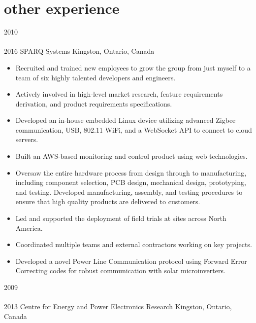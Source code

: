 
\section{other experience}
\begin{entrylist}
\entry
  {2010\\\faChevronDown\\2016}
  {SPARQ Systems}
  {Kingston, Ontario, Canada}
  {
  \begin{itemize}[leftmargin=12pt]
    \item Recruited and trained new employees to grow the group from just myself to a team of six highly talented developers and engineers.
    \item Actively involved in high-level market research, feature requirements derivation, and product requirements specifications.
    \item Developed an in-house embedded Linux device utilizing advanced Zigbee communication, USB, 802.11 WiFi, and a WebSocket API to connect to cloud servers.
    \item Built an AWS-based monitoring and control product using web technologies.
    \item Oversaw the entire hardware process from design through to manufacturing, including component selection, PCB design, mechanical design, prototyping, and testing. Developed manufacturing, assembly, and testing procedures to ensure that high quality products are delivered to customers.
    \item Led and supported the deployment of field trials at sites across North America.
    \item Coordinated multiple teams and external contractors working on key projects.
    \item Developed a novel Power Line Communication protocol using Forward Error Correcting codes for robust communication with solar microinverters.
\end{itemize}
}
\entry
  {2009\\\faChevronDown\\2013}
  {Centre for Energy and Power Electronics Research}
  {Kingston, Ontario, Canada}
  {
}
\end{entrylist}
